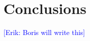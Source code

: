 \documentclass[letterpaper]{article}
\newcommand{\mypar}[1]{{\bf #1.}}
\newcommand{\erik}[1]{\textcolor{blue}{[Erik: #1]}}
\begin{document}
%
%
%
%
%

\section{Conclusions}
\erik{Boris will write this}

\end{document}
